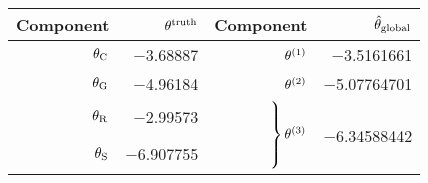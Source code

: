 \documentclass[../../Main_ManuscritThese.tex]{subfiles}
\begin{document}
\begin{table}[!h]
  \centering
  \begin{tabular}{rrrr}\toprule
   Component              & $\theta^{\mathrm{truth}}$                                                                                                                                                                                                                                                                      & Component                & $\hat{\theta}_{\mathrm{global}}$                                              \\ \midrule
    $\theta_{\mathrm{C}}$    & \num[round-mode=places,round-precision=4]{-3.68887}                                                                                                                                                                                                                                         & $\theta^{(1)}$                  & \num[round-mode=places,round-precision=4]{-3.5161661}                   \\
    $\theta_{\mathrm{G}}$    & \num[round-mode=places,round-precision=4]{-4.96184}                                                                                                                                                                                                                                         & $\theta^{(2)}$                  & \num[round-mode=places,round-precision=4]{-5.07764701}                  \\
    $\theta_{\mathrm{R}}$    & \num[round-mode=places,round-precision=4]{-2.99573}                                                                                                                                                                                                                                         & \multirow{4}{*}{$\left. \vphantom{\begin{tabular}{c}3\\3\\3\\3\end{tabular}}\right\}\kk^{(3)}$} & \multirow{4}{*}{\num[round-mode=places,round-precision=4]{-6.34588442}} \\
    $\theta_{\mathrm{S}}$    & \num[round-mode=places,round-precision=4]{-6.907755}                                                                                                                                                                                                                                        &                          &                                                                         \\

\end{tabular}
\end{table}
\end{document}
